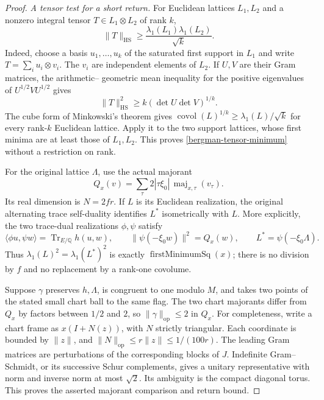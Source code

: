 \begin{proof}
\emph{A tensor test for a short return.}
For Euclidean lattices $L_1,L_2$ and a nonzero integral tensor
$T\in L_1\otimes L_2$ of rank $k$,
\begin{equation}
 \label{bergman-tensor-minimum}
 \|T\|_{\mathrm{HS}}\geq
      \frac{\lambda_1(L_1)\lambda_1(L_2)}{\sqrt{k}}.
\end{equation}
Indeed, choose a basis $u_1,\ldots,u_k$ of the saturated first support
in $L_1$ and write $T=\sum_i u_i\otimes v_i$.  The $v_i$ are independent
elements of $L_2$.  If $U,V$ are their Gram matrices, the arithmetic--
geometric mean inequality for the positive eigenvalues of
$U^{1/2}VU^{1/2}$ gives
\[
 \|T\|_{\mathrm{HS}}^2
 \geq k(\det U\det V)^{1/k}.
\]
The cube form of Minkowski's theorem gives
$\operatorname{covol}(L)^{1/k}\geq\lambda_1(L)/\sqrt{k}$
for every rank-$k$ Euclidean lattice.  Apply it to the two support
lattices, whose first minima are at least those of $L_1,L_2$.
This proves \eqref{bergman-tensor-minimum} without a restriction on rank.

For the original lattice $\Lambda$, use the actual majorant
\[
 Q_x(v)=\sum_\tau2|\tau\xi_0|\,
                 \operatorname{maj}_{x,\tau}(v_\tau).
\]
Its real dimension is $N=2fr$.  If $L$ is its Euclidean realization,
the original alternating trace self-duality identifies $L^*$
isometrically with $L$.  More explicitly, the two trace-dual
realizations $\phi,\psi$ satisfy
\[
 \langle\phi u,\psi w\rangle=\operatorname{Tr}_{E/\mathbb Q}h(u,w),
 \qquad \|\psi(-\xi_0w)\|^2=Q_x(w),
 \qquad L^*=\psi(-\xi_0\Lambda).
\]
Thus $\lambda_1(L)^2=\lambda_1(L^*)^2$
is exactly $\operatorname{firstMinimumSq}(x)$; there is no division by
$f$ and no replacement by a rank-one covolume.

Suppose $\gamma$ preserves $h,\Lambda$, is congruent to one modulo $M$,
and takes two points of the stated small chart ball to the same flag.
The two chart majorants differ from $Q_x$ by factors between $1/2$ and
$2$, so $\|\gamma\|_{\mathrm{op}}\leq2$ in $Q_x$.
For completeness, write a chart frame as $x(I+N(z))$, with $N$ strictly
triangular.  Each coordinate is bounded by $\|z\|$, and
$\|N\|_{\mathrm{op}}\leq r\|z\|\leq1/(100r)$.
The leading Gram matrices are perturbations of the corresponding
blocks of $J$.  Indefinite Gram--Schmidt, or its successive Schur
complements, gives a unitary representative with norm and inverse norm
at most $\sqrt2$.  Its ambiguity is the compact diagonal torus.
This proves the asserted majorant comparison and return bound.


\end{proof}
